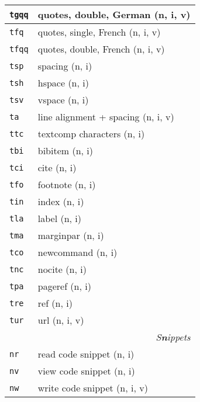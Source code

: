 \documentclass[oneside,10pt,landscape,DIV17]{scrartcl}
\newcommand{\Map}[1] {\textbf{\textasciiacute}\texttt{#1}}
\begin{document}
\begin{multicols}{3}
\begin{center}
\begin{tabular}[]{|p{11mm}|p{60mm}|}
\hline \Map{tgqq} & quotes, double, German         \hfill (n, i, v)\\
\hline \Map{tfq}  & quotes, single, French         \hfill (n, i, v)\\
\hline \Map{tfqq} & quotes, double, French         \hfill (n, i, v)\\
\hline \Map{tsp}  & spacing                        \hfill (n, i)\\
\hline \Map{tsh}  & hspace                         \hfill (n, i)\\
\hline \Map{tsv}  & vspace                         \hfill (n, i)\\
\hline \Map{ta}   & line alignment + spacing       \hfill (n, i, v)\\
\hline \Map{ttc}  & textcomp characters            \hfill (n, i)\\
\hline
\hline \Map{tbi}  & bibitem                        \hfill (n, i)\\
\hline \Map{tci}  & cite                           \hfill (n, i)\\
\hline \Map{tfo}  & footnote                       \hfill (n, i)\\
\hline \Map{tin}  & index                          \hfill (n, i)\\
\hline \Map{tla}  & label                          \hfill (n, i)\\
\hline \Map{tma}  & marginpar                      \hfill (n, i)\\
\hline \Map{tco}  & newcommand                     \hfill (n, i)\\
\hline \Map{tnc}  & nocite                         \hfill (n, i)\\
\hline \Map{tpa}  & pageref                        \hfill (n, i)\\
\hline \Map{tre}  & ref                            \hfill (n, i)\\
\hline \Map{tur}  & url                            \hfill (n, i, v)\\
\hline
\hline
\multicolumn{2}{|r|}{\textsl{S\textbf{n}ippets}}                \\[1.0ex]
\hline \Map{nr}  & read code snippet         \hfill (n, i)   \\
\hline \Map{nv}  & view code snippet         \hfill (n, i)   \\
\hline \Map{nw}  & write code snippet        \hfill (n, i, v)\\

\end{tabular}
\end{center}
\end{multicols}
\end{document}
